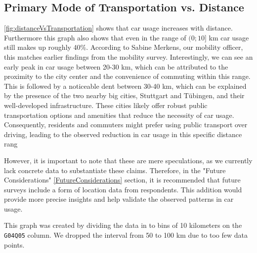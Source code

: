 
\subsection{Primary Mode of Transportation vs. Distance}

\ref{fig:distanceVsTransportation} shows that car usage increases with distance. Furthermore this graph also shows that even in the range of $(0;10]$ km car usage still makes up roughly 40\%. According to Sabine Merkens, our mobility officer, this matches earlier findings from the mobility survey. 
Interestingly, we can see an early peak in car usage between 20-30 km, which can be attributed to the proximity to the city center and the convenience of commuting within this range. This is followed by a noticeable dent between 30-40 km, which can be explained by the presence of the two nearby big cities, Stuttgart and Tübingen, and their well-developed infrastructure. These cities likely offer robust public transportation options and amenities that reduce the necessity of car usage. Consequently, residents and commuters might prefer using public transport over driving, leading to the observed reduction in car usage in this specific distance rang

However, it is important to note that these are mere speculations, as we currently lack concrete data to substantiate these claims. Therefore, in the "Future Considerations" \ref{FutureConsiderations} section, it is recommended that future surveys include a form of location data from respondents. This addition would provide more precise insights and help validate the observed patterns in car usage.

This graph was created by dividing the data in to bins of 10 kilometers on the \texttt{G04Q05} column. We dropped the interval from 50 to 100 km due to too few data points.

